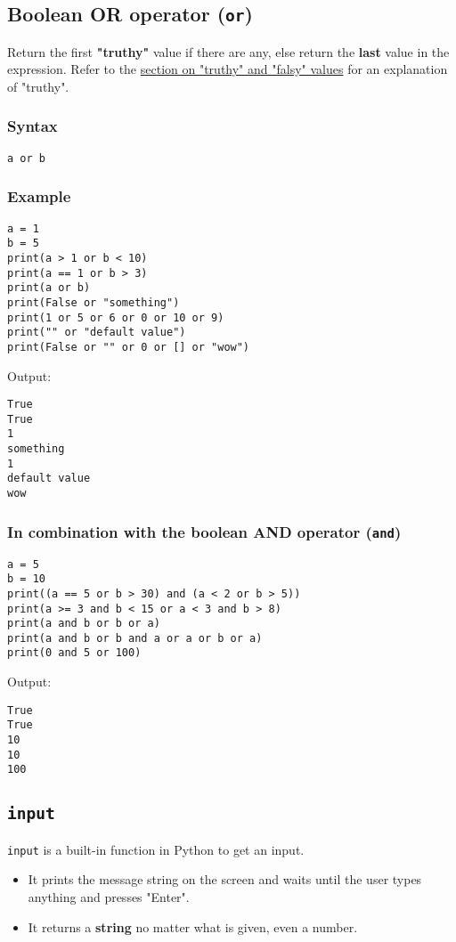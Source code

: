 \documentclass[11pt]{article}
\begin{document}
 \newpage
\subsection{Boolean OR operator (\texttt{or})}
\label{sec:org0a554ca}
Return the first \textbf{"truthy"} value if there are any, else return the \textbf{last} value in the expression. Refer to the \hyperref[orgbe4ee6d]{section on "truthy" and "falsy" values} for an explanation of "truthy".
\subsubsection{Syntax}
\label{sec:orgfbe5500}
\begin{verbatim}
a or b
\end{verbatim}
\subsubsection{Example}
\label{sec:orgfcfd5bc}
\begin{verbatim}
a = 1
b = 5
print(a > 1 or b < 10)
print(a == 1 or b > 3)
print(a or b)
print(False or "something")
print(1 or 5 or 6 or 0 or 10 or 9)
print("" or "default value")
print(False or "" or 0 or [] or "wow")
\end{verbatim}

 \noindent Output:

\label{org5a6a66e}
\begin{verbatim}
True
True
1
something
1
default value
wow
\end{verbatim}


 \newpage
\subsubsection{In combination with the boolean AND operator (\texttt{and})}
\label{sec:orgc3739c8}
\begin{verbatim}
a = 5
b = 10
print((a == 5 or b > 30) and (a < 2 or b > 5))
print(a >= 3 and b < 15 or a < 3 and b > 8)
print(a and b or b or a)
print(a and b or b and a or a or b or a)
print(0 and 5 or 100)
\end{verbatim}

 \noindent Output:

\label{org534cfa3}
\begin{verbatim}
True
True
10
10
100
\end{verbatim}
\subsection{\texttt{input}}
\label{sec:org7a6f2f2}
\texttt{input} is a built-in function in Python to get an input.
\begin{itemize}
\item It prints the message string on the screen and waits until the user types anything and presses "Enter".
\item It returns a \textbf{string} no matter what is given, even a number.
\end{itemize}
\end{document}
